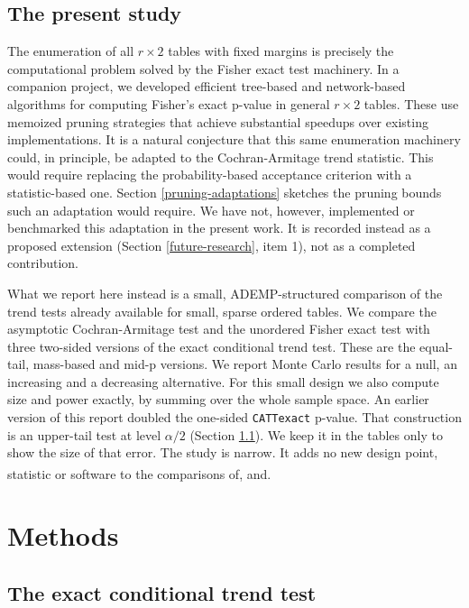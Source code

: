 \documentclass[
  11pt,
]{article}
\begin{document}
\subsection{The present study}\label{the-present-study}

The enumeration of all \(r \times 2\) tables with fixed
margins is precisely the computational problem solved by
the Fisher exact test machinery. In a companion project,
we developed efficient tree-based and network-based
algorithms for computing Fisher's exact p-value in
general \(r \times 2\) tables. These use memoized pruning
strategies that achieve substantial speedups over
existing implementations. It is a natural conjecture that
this same enumeration machinery could, in principle, be
adapted to the Cochran-Armitage trend statistic. This
would require replacing the probability-based acceptance
criterion with a statistic-based one. Section
\ref{pruning-adaptations} sketches the pruning bounds
such an adaptation would require. We have not, however,
implemented or benchmarked this adaptation in the
present work. It is recorded instead as a proposed
extension (Section \ref{future-research}, item 1), not
as a completed contribution.

What we report here instead is a small, ADEMP-structured
comparison of the trend tests already available for small,
sparse ordered tables. We compare the asymptotic
Cochran-Armitage test and the unordered Fisher exact test
with three two-sided versions of the exact conditional
trend test. These are the equal-tail, mass-based and
mid-p versions. We report Monte Carlo results for a null,
an increasing and a decreasing alternative. For this
small design we also compute size and power exactly, by
summing over the whole sample space. An earlier version
of this report doubled the one-sided \texttt{CATTexact} p-value.
That construction is an upper-tail test at level
\(\alpha/2\) (Section \ref{the-exact-conditional-trend-test}).
We keep it in the tables only to show the size of that
error. The study is narrow. It adds no new design point,
statistic or software to the comparisons of\textsuperscript{},\textsuperscript{} and\textsuperscript{}.

\section{Methods}\label{methods}

\subsection{The exact conditional trend test}\label{the-exact-conditional-trend-test}
\end{document}
